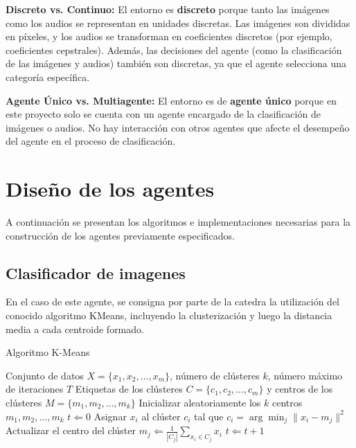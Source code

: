 \documentclass[12pt,a4paper]{article}
\begin{document}
\vspace{10pt}

\textbf{Discreto vs. Continuo:}  
El entorno es \textbf{discreto} porque tanto las imágenes como los audios se representan en unidades discretas. Las imágenes son divididas en píxeles, y los audios se transforman en coeficientes discretos (por ejemplo, coeficientes cepstrales). Además, las decisiones del agente (como la clasificación de las imágenes y audios) también son discretas, ya que el agente selecciona una categoría específica.

\vspace{10pt}

\textbf{Agente Único vs. Multiagente:}  
El entorno es de \textbf{agente único} porque en este proyecto solo se cuenta con un agente encargado de la clasificación de imágenes o audios. No hay interacción con otros agentes que afecte el desempeño del agente en el proceso de clasificación.

\section{Diseño de los agentes}
A continuación se presentan los algoritmos e implementaciones necesarias para la construcción de los agentes previamente especificados.
\subsection{Clasificador de imagenes}
En el caso de este agente, se consigna por parte de la catedra la utilización del conocido algoritmo KMeans, incluyendo la clusterización y luego la distancia media a cada centroide formado.
\begin{algorithm}[!ht]
\caption{Algoritmo K-Means}\label{algo_kmeans}
\begin{algorithmic}[1]
\Require Conjunto de datos $X = \{x_1, x_2, \dots, x_m\}$, número de clústeres $k$, número máximo de iteraciones $T$
\Ensure Etiquetas de los clústeres $C = \{c_1, c_2, \dots, c_m\}$ y centros de los clústeres $M = \{m_1, m_2, \dots, m_k\}$
\State Inicializar aleatoriamente los $k$ centros $m_1, m_2, \dots, m_k$
\State $t \Leftarrow 0$
\Repeat
        \State Asignar $x_i$ al clúster $c_i$ tal que $c_i = \arg\min_j \| x_i - m_j \|^2$
    \EndFor
        \State Actualizar el centro del clúster $m_j \Leftarrow \frac{1}{|C_j|} \sum_{x_i \in C_j} x_i$
    \EndFor
    \State $t \Leftarrow t + 1$
\end{algorithmic}
\end{algorithm}
\end{document}
